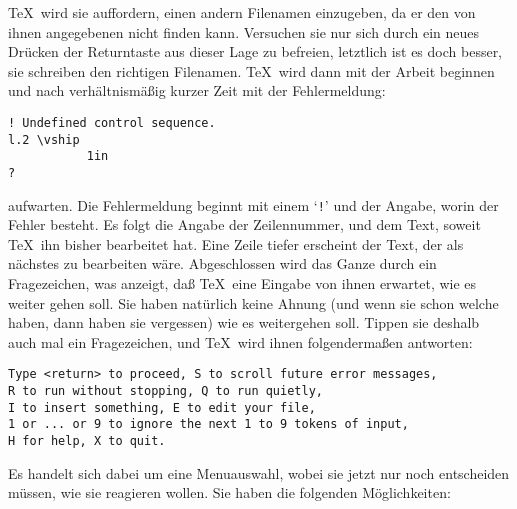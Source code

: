 \TeX\ wird sie auffordern, einen andern Filenamen einzugeben, da er
den von ihnen angegebenen nicht finden kann. Versuchen sie nur sich durch
ein neues Dr\"ucken der Returntaste aus dieser Lage zu befreien,
letztlich ist es doch besser, sie schreiben den richtigen Filenamen.
\TeX\ wird dann mit der Arbeit beginnen und nach verh\"altnism\"a\ss{}ig
kurzer Zeit mit der Fehlermeldung:
\begin{verbatim}
! Undefined control sequence.
l.2 \vship
           1in
?
\end{verbatim}
aufwarten. Die Fehlermeldung beginnt mit einem `\verb|!|' und der
Angabe, worin der Fehler besteht. Es folgt die Angabe der
Zeilennummer, und dem Text, soweit \TeX\ ihn bisher bearbeitet hat.
Eine Zeile tiefer erscheint der Text, der als n\"achstes zu bearbeiten
w\"are. Abgeschlossen wird das Ganze durch ein 
Fragezeichen, was
anzeigt, da\ss{} \TeX\ eine Eingabe von ihnen erwartet, wie es weiter
gehen soll. Sie haben nat\"urlich keine Ahnung (und wenn sie schon
welche haben, dann haben sie vergessen) wie es weitergehen soll.
Tippen sie deshalb auch mal ein Fragezeichen, und \TeX\ wird ihnen
folgenderma\ss{}en antworten:
\begin{verbatim}
Type <return> to proceed, S to scroll future error messages,
R to run without stopping, Q to run quietly,
I to insert something, E to edit your file,
1 or ... or 9 to ignore the next 1 to 9 tokens of input,
H for help, X to quit.
\end{verbatim}
Es handelt sich dabei um eine Menuauswahl, wobei sie jetzt nur noch
entscheiden m\"ussen, wie sie reagieren wollen. Sie haben die folgenden
M\"oglichkeiten:
